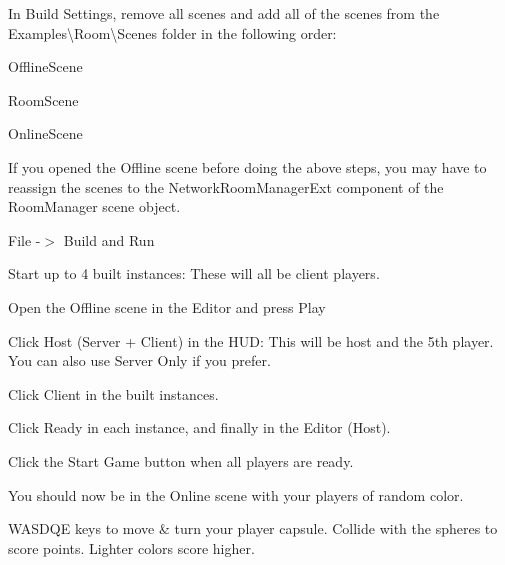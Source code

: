 In Build Settings, remove all scenes and add all of the scenes from the Examples\textbackslash{}\+Room\textbackslash{}\+Scenes folder in the following order\+:
\begin{DoxyItemize}
\item Offline\+Scene
\item Room\+Scene
\item Online\+Scene
\end{DoxyItemize}

If you opened the Offline scene before doing the above steps, you may have to reassign the scenes to the Network\+Room\+Manager\+Ext component of the Room\+Manager scene object.

File -\/$>$ Build and Run

Start up to 4 built instances\+: These will all be client players.

Open the Offline scene in the Editor and press Play

Click Host (Server + Client) in the H\+UD\+: This will be host and the 5th player. You can also use Server Only if you prefer.

Click Client in the built instances.

Click Ready in each instance, and finally in the Editor (Host).

Click the Start Game button when all players are ready.

You should now be in the Online scene with your players of random color.

W\+A\+S\+D\+QE keys to move \& turn your player capsule. Collide with the spheres to score points. Lighter colors score higher. 